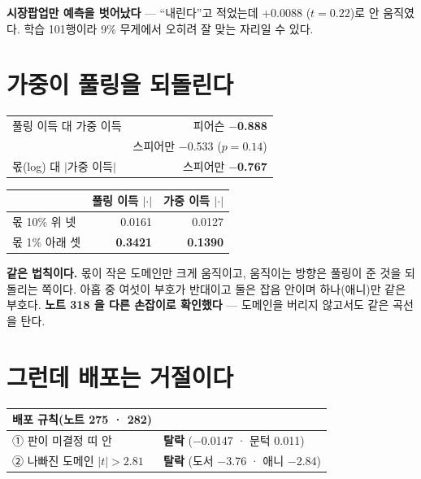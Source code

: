 \documentclass[10pt]{article}
\begin{document}
\textbf{시장팝업만 예측을 벗어났다} --- ``내린다''고 적었는데 $+$0.0088
($t{=}0.22$)로 안 움직였다. 학습 101행이라 9\% 무게에서 오히려 잘 맞는
자리일 수 있다.

\section{가중이 풀링을 되돌린다}

\begin{center}\small
\begin{tabular}{lr}
\hline
풀링 이득 대 가중 이득 & 피어슨 \textbf{$-$0.888} \\
& 스피어만 $-$0.533 ($p{=}0.14$) \\
몫(log) 대 $|$가중 이득$|$ & 스피어만 \textbf{$-$0.767} \\
\hline
\end{tabular}
\end{center}

\begin{center}\footnotesize
\begin{tabular}{lrr}
\hline
& 풀링 이득 $|\cdot|$ & 가중 이득 $|\cdot|$ \\
\hline
몫 10\% 위 넷 & 0.0161 & 0.0127 \\
몫 1\% 아래 셋 & \textbf{0.3421} & \textbf{0.1390} \\
\hline
\end{tabular}
\end{center}

\textbf{같은 법칙이다.} 몫이 작은 도메인만 크게 움직이고, 움직이는 방향은
풀링이 준 것을 되돌리는 쪽이다. 아홉 중 여섯이 부호가 반대이고 둘은 잡음
안이며 하나(애니)만 같은 부호다. \textbf{노트 318 을 다른 손잡이로 확인했다}
--- 도메인을 버리지 않고서도 같은 곡선을 탄다.

\section{그런데 배포는 거절이다}

\begin{center}\footnotesize
\begin{tabular}{ll}
\hline
배포 규칙(노트 275 · 282) & \\
\hline
① 판이 미결정 띠 안 & \textbf{탈락} ($-$0.0147 · 문턱 0.011) \\
② 나빠진 도메인 $|t|{>}2.81$ & \textbf{탈락} (도서 $-$3.76 · 애니 $-$2.84) \\
\hline
\end{tabular}
\end{center}
\end{document}
